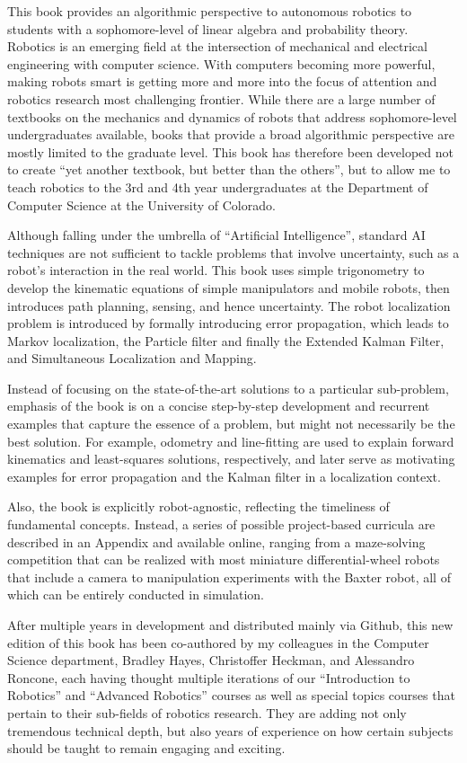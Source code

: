 \documentclass[paper=7in:9in,pagesize=pdftex,11pt,twoside,openright]{scrbook}
\begin{document}
This book provides an algorithmic perspective to autonomous robotics to students with a sophomore-level of linear algebra and probability theory. Robotics is an emerging field at the intersection of mechanical and electrical engineering with computer science. With computers becoming more powerful, making robots smart is getting more and more into the focus of attention and robotics research most challenging frontier. While there are a large number of textbooks on the mechanics and dynamics of robots that address sophomore-level undergraduates available, books that provide a broad algorithmic perspective are mostly limited to the graduate level. This book has therefore been developed not to create ``yet another textbook, but better than the others'', but to allow me to teach robotics to the 3rd and 4th year undergraduates at the Department of Computer Science at the University of Colorado.

Although falling under the umbrella of ``Artificial Intelligence'', standard AI techniques are not sufficient to tackle problems that involve uncertainty, such as a robot's interaction in the real world. This book uses simple trigonometry to develop the kinematic equations of simple manipulators and mobile robots, then introduces path planning, sensing, and hence uncertainty. The robot localization problem is introduced by formally introducing error propagation, which leads to Markov localization, the Particle filter and finally the Extended Kalman Filter, and Simultaneous Localization and Mapping.

Instead of focusing on the state-of-the-art solutions to a particular sub-problem, emphasis of the book is on a concise step-by-step development and recurrent examples that capture the essence of a problem, but might not necessarily be the best solution. For example, odometry and line-fitting are used to explain forward kinematics and least-squares solutions, respectively, and later serve as motivating examples for error propagation and the Kalman filter in a localization context.

Also, the book is explicitly robot-agnostic, reflecting the timeliness of fundamental concepts. Instead, a series of possible project-based curricula are described in an Appendix and available online, ranging from a maze-solving competition that can be realized with most miniature differential-wheel robots that include a camera to manipulation experiments with the Baxter robot, all of which can be entirely conducted in simulation.

After multiple years in development and distributed mainly via Github, this new edition of this book has been co-authored by my colleagues in the Computer Science department, Bradley Hayes, Christoffer Heckman, and Alessandro Roncone, each having thought multiple iterations of our ``Introduction to Robotics'' and ``Advanced Robotics'' courses as well as special topics courses that pertain to their sub-fields of robotics research. They are adding not only tremendous technical depth, but also years of experience on how certain subjects should be taught to remain engaging and exciting.
\end{document}
